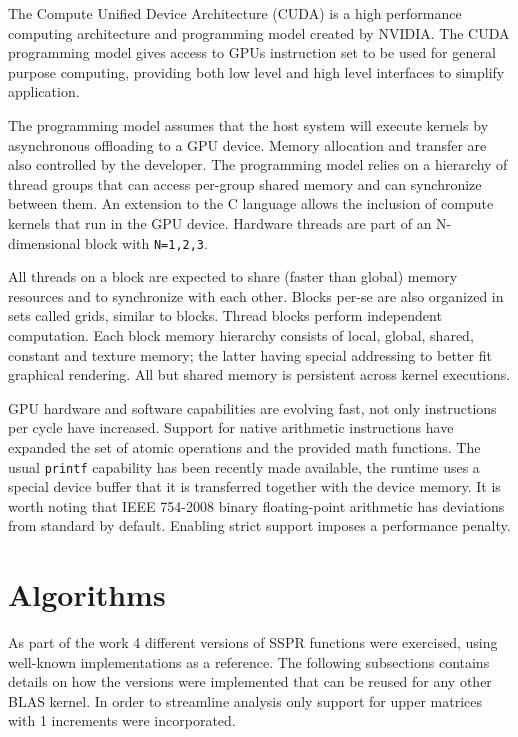 \documentclass{llncs}
\begin{document}
The Compute Unified Device Architecture (CUDA) is a high performance computing architecture and programming
model created by NVIDIA. The CUDA programming model gives access to GPUs instruction
set to be used for general purpose computing, providing both low level and high level interfaces to simplify
application.

\smallskip

The programming model assumes that the host system will execute kernels by asynchronous offloading
to a GPU device. Memory allocation and transfer are also controlled by the developer. The programming
model relies on a hierarchy of thread groups that can access per-group shared memory and can synchronize
between them. An extension to the C language allows the inclusion of compute kernels that run in the GPU
device. Hardware threads are part of an N-dimensional block with {\tt N=1,2,3}.

\smallskip

All threads on a block are expected to share (faster than global) memory resources and to synchronize
with each other. Blocks per-se are also organized in sets called grids, similar to blocks. Thread blocks
perform independent computation. Each block memory hierarchy consists of local, global, shared, constant
and texture memory; the latter having special addressing to better fit graphical rendering. All but shared
memory is persistent across kernel executions.

\smallskip

GPU hardware and software capabilities are evolving fast, not only instructions per cycle have increased.
Support for native arithmetic instructions have expanded the set of atomic operations and the provided math
functions. The usual {\tt printf} capability has been recently made available, the runtime uses a special device
buffer that it is transferred together with the device memory. It is worth noting that IEEE 754-2008
binary floating-point arithmetic has deviations from standard by default. Enabling strict support imposes
a performance penalty.

\section{Algorithms}

As part of the work 4 different versions of SSPR functions were exercised, using well-known implementations as a reference. 
The following subsections contains details on how the versions were implemented that can be reused for any other BLAS kernel. In order to streamline analysis only support for upper matrices with 1 increments were incorporated.
\end{document}
